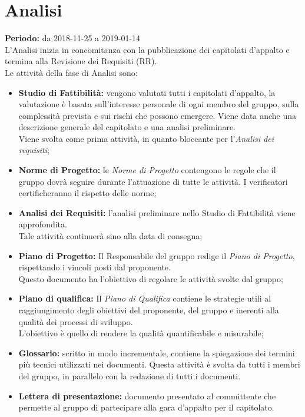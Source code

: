 \section{Analisi}
\textbf{Periodo:} da 2018-11-25 a 2019-01-14\\L'Analisi inizia in concomitanza con la pubblicazione dei capitolati d’appalto e termina alla Revisione dei Requisiti (RR).\\
Le attività della fase di Analisi sono:
\begin{itemize}
    \item \textbf{Studio di Fattibilità:} vengono valutati tutti i capitolati d'appalto, la valutazione è basata sull'interesse personale di ogni membro del gruppo, sulla complessità prevista e sui rischi che possono emergere. Viene data anche una descrizione generale del capitolato e una analisi preliminare.\\Viene svolta come prima attività, in quanto bloccante per l'\textit{Analisi dei requisiti};
    \item \textbf{Norme di Progetto:} le \textit{Norme di Progetto} contengono le regole che il gruppo dovrà seguire durante l'attuazione di tutte le attività. I verificatori certificheranno il rispetto delle norme;
    \item \textbf{Analisi dei Requisiti:} l'analisi preliminare nello Studio di Fattibilità viene approfondita.\\Tale attività continuerà sino alla data di consegna;
    \item \textbf{Piano di Progetto:} Il Responsabile del gruppo redige il \textit{Piano di Progetto}, rispettando i vincoli posti dal proponente.\\Questo documento ha l'obiettivo di regolare le attività svolte dal gruppo;
    \item \textbf{Piano di qualifica:} Il \textit{Piano di Qualifica} contiene le strategie utili al raggiungimento degli obiettivi del proponente, del gruppo e inerenti alla qualità dei processi di sviluppo.\\L'obiettivo è quello di rendere la qualità quantificabile e misurabile;
    \item \textbf{Glossario:} scritto in modo incrementale, contiene la spiegazione dei termini più tecnici utilizzati nei documenti. Questa attività è svolta da tutti i membri del gruppo, in parallelo con la redazione di tutti i documenti.
    \item \textbf{Lettera di presentazione:} documento presentato al committente che permette al gruppo di partecipare alla gara d’appalto per il capitolato.
\end{itemize}
